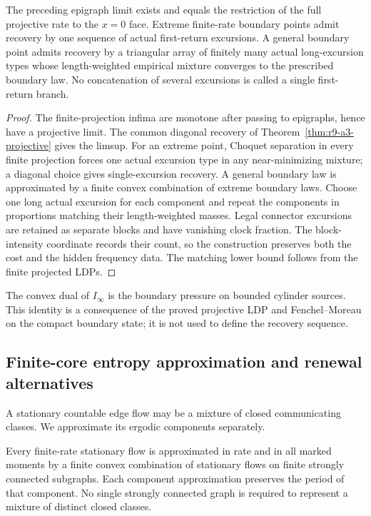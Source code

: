 \begin{theorem}
\label{thm:r9-a3-recession}
The preceding epigraph limit exists and equals the restriction of the full
projective rate to the $x=0$ face.  Extreme finite-rate boundary points admit
recovery by one sequence of actual first-return excursions.  A general
boundary point admits recovery by a triangular array of finitely many actual
long-excursion types whose length-weighted empirical mixture converges to the
prescribed boundary law.  No concatenation of several excursions is called a
single first-return branch.
\end{theorem}

\begin{proof}
The finite-projection infima are monotone after passing to epigraphs, hence have
a projective limit.  The common diagonal recovery of
Theorem~\ref{thm:r9-a3-projective} gives the limsup.  For an extreme point,
Choquet separation in every finite projection forces one actual excursion type
in any near-minimizing mixture; a diagonal choice gives single-excursion
recovery.  A general boundary law is approximated by a finite convex
combination of extreme boundary laws.  Choose one long actual excursion for
each component and repeat the components in proportions matching their
length-weighted masses.  Legal connector excursions are retained as separate
blocks and have vanishing clock fraction.  The block-intensity coordinate
records their count, so the construction preserves both the cost and the
hidden frequency data.  The matching lower bound follows from the finite
projected LDPs.
\end{proof}

The convex dual of $I_\infty$ is the boundary pressure on bounded cylinder
sources.  This identity is a consequence of the proved projective LDP and
Fenchel--Moreau on the compact boundary state; it is not used to define the
recovery sequence.

\subsection{Finite-core entropy approximation and renewal alternatives}

A stationary countable edge flow may be a mixture of closed communicating
classes.  We approximate its ergodic components separately.

\begin{theorem}
\label{thm:r9-a3-core}
Every finite-rate stationary flow is approximated in rate and in all marked
moments by a finite convex combination of stationary flows on finite strongly
connected subgraphs.  Each component approximation preserves the period of
that component.  No single strongly connected graph is required to represent
a mixture of distinct closed classes.
\end{theorem}

